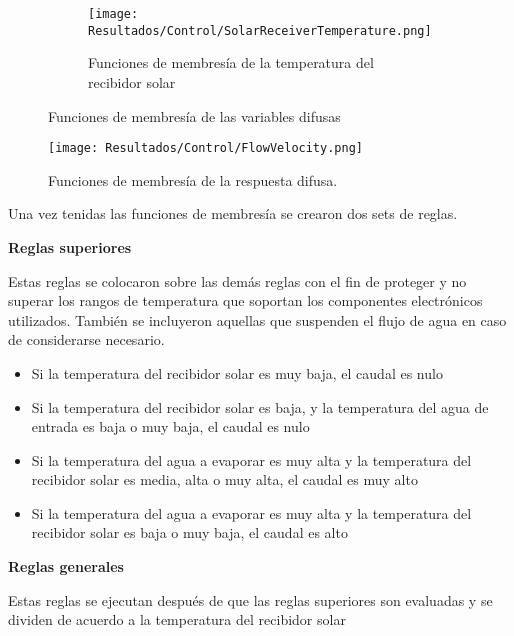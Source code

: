 			\begin{figure}[H]\ContinuedFloat
				\begin{subfigure}[t]{0.45\linewidth}
					\centering
					\texttt{[image: Resultados/Control/SolarReceiverTemperature.png]}
					\caption{Funciones de membresía de la temperatura del recibidor solar}
					\label{fig:SolarReceiverTemperature}
				\end{subfigure}
				\hfill
				\caption{Funciones de membresía de las variables difusas}
				\label{fig:var-membership-functions}
			\end{figure}
			
			\begin{figure}[H]
				\centering
				\texttt{[image: Resultados/Control/FlowVelocity.png]}
				\caption{Funciones de membresía de la respuesta difusa.}
				\label{fig:FlowVelocity}
			\end{figure}
			
			Una vez tenidas las funciones de membresía se crearon dos sets de reglas.
			
			\textbf{Reglas superiores}\par
			
			Estas reglas se colocaron sobre las demás reglas con el fin de proteger y no superar los rangos de temperatura que soportan los componentes electrónicos utilizados. También se incluyeron aquellas que suspenden el flujo de agua en caso de considerarse necesario.
			
			\begin{itemize}
				\item Si la temperatura del recibidor solar es muy baja, el caudal es nulo
				\item Si la temperatura del recibidor solar es baja, y la temperatura del agua de entrada es baja o muy baja, el caudal es nulo
				\item Si la temperatura del agua a evaporar es muy alta y la temperatura del recibidor solar es media, alta o muy alta, el caudal es muy alto
				\item Si la temperatura del agua a evaporar es muy alta y la temperatura del recibidor solar es baja o muy baja, el caudal es alto
			\end{itemize}
			
			\textbf{Reglas generales}\par
			
			Estas reglas se ejecutan después de que las reglas superiores son evaluadas y se dividen de acuerdo a la temperatura del recibidor solar
			

